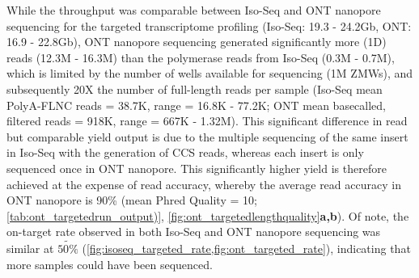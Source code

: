 While the throughput was comparable between Iso-Seq and ONT nanopore sequencing for the targeted transcriptome profiling (Iso-Seq: 19.3 - 24.2Gb, ONT: 16.9 - 22.8Gb), ONT nanopore sequencing generated significantly more (1D) reads (12.3M - 16.3M) than the polymerase reads from Iso-Seq (0.3M - 0.7M), which is limited by the number of wells available for sequencing (1M ZMWs), and subsequently 20X the number of full-length reads per sample (Iso-Seq mean PolyA-FLNC reads = 38.7K, range = 16.8K - 77.2K; ONT mean basecalled, filtered reads = 918K, range = 667K - 1.32M). This significant difference in read but comparable yield output is due to the multiple sequencing of the same insert in Iso-Seq with the generation of CCS reads, whereas each insert is only sequenced once in ONT nanopore. This significantly higher yield is therefore achieved at the expense of read accuracy, whereby the average read accuracy in ONT nanopore is 90\% (mean Phred Quality = 10; \cref{tab:ont_targetedrun_output)}, \cref{fig:ont_targetedlengthquality}\textbf{a,b}). Of note, the on-target rate observed in both Iso-Seq and ONT nanopore sequencing was similar at $\tilde{50\%}$ (\cref{fig:isoseq_targeted_rate,fig:ont_targeted_rate}), indicating that more samples could have been sequenced.  

